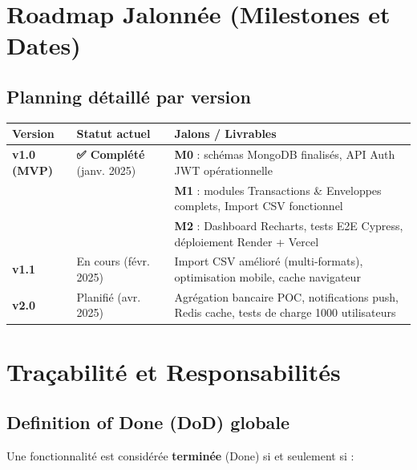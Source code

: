 \section{Roadmap Jalonnée (Milestones et Dates)}

\subsection{Planning détaillé par version}

\begin{center}
\scriptsize
\begin{tabular}{|p{2.5cm}|p{2.5cm}|p{8.5cm}|}
\hline
\textbf{Version} & \textbf{Statut actuel} & \textbf{Jalons / Livrables} \\
\hline
\textbf{v1.0 (MVP)} & \textbf{✅ Complété} (janv. 2025) & \textbf{M0} : schémas MongoDB finalisés, API Auth JWT opérationnelle \\
 & & \textbf{M1} : modules Transactions \& Enveloppes complets, Import CSV fonctionnel \\
 & & \textbf{M2} : Dashboard Recharts, tests E2E Cypress, déploiement Render + Vercel \\
\hline
\textbf{v1.1} & En cours (févr. 2025) & Import CSV amélioré (multi-formats), optimisation mobile, cache navigateur \\
\hline
\textbf{v2.0} & Planifié (avr. 2025) & Agrégation bancaire POC, notifications push, Redis cache, tests de charge 1000 utilisateurs \\
\hline
\end{tabular}
\end{center}

\section{Traçabilité et Responsabilités}

\subsection{Definition of Done (DoD) globale}

Une fonctionnalité est considérée \textbf{terminée} (Done) si et seulement si :

